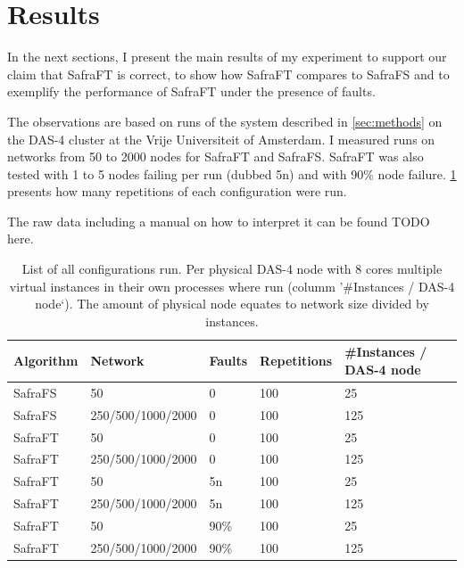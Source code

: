 \section{Results}
\label{sec:results}
In the next sections, I present the main results of my experiment to support our claim that SafraFT is correct, to show how SafraFT compares to SafraFS and to exemplify the performance of SafraFT under the presence of faults.

The observations are based on runs of the system described in \cref{sec:methods} on the DAS-4 cluster at the Vrije Universiteit of Amsterdam.
I measured runs on networks from 50 to 2000 nodes for SafraFT and SafraFS.
SafraFT was also tested with 1 to 5 nodes failing per run (dubbed 5n) and with 90\% node failure.
\cref{table:runs} presents how many repetitions of each configuration were run.

The raw data including a manual on how to interpret it can be found TODO here.
\begin{table}[]
	\centering
	\begin{tabular}{@{}lllll@{}}
		\toprule
		Algorithm & Network              & Faults & Repetitions  & \#Instances / DAS-4 node   \\ \midrule
		SafraFS   & 50                   & 0      & 100          & 25                    \\
		SafraFS   & 250/500/1000/2000    & 0      & 100          & 125                   \\
		SafraFT   & 50                   & 0      & 100          & 25                    \\
		SafraFT   & 250/500/1000/2000    & 0      & 100          & 125                   \\
		SafraFT   & 50                   & 5n     & 100          & 25                    \\
		SafraFT   &    250/500/1000/2000 & 5n     & 100          & 125                   \\
		SafraFT   & 50                   & 90\%   & 100          & 25                    \\
		SafraFT   &    250/500/1000/2000 & 90\%   & 100          & 125                   \\ \bottomrule
	\end{tabular}
	\caption{List of all configurations run. Per physical DAS-4 node with 8 cores multiple virtual instances in their own processes where run (columm '\#Instances / DAS-4 node`). The amount of physical node equates to network size divided by instances.}
	\label{table:runs}
\end{table}

